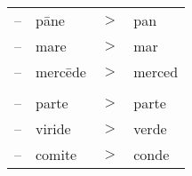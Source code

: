 \documentclass[convert={density=300,size=1080x800,outext=.png}]{standalone}
\begin{document}
\begin{tabular}{llcl}
-- & p\={a}ne    & $>$ & pan \\
-- & mare        & $>$ & mar  \\
-- & merc\={e}de & $>$ & merced \\
   &             &     & \\
-- & parte       & $>$ & parte  \\
-- & viride      & $>$ & verde  \\
-- & comite      & $>$ & conde \\
\end{tabular}
\end{document}
